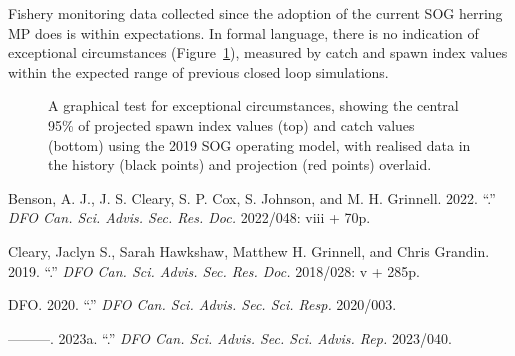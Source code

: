 \documentclass[11pt]{book}
\begin{document}
Fishery monitoring data collected since the adoption of the current SOG herring MP does is within expectations. In formal language, there is no indication of exceptional circumstances (Figure~\ref{fig:ECfig}), measured by catch and spawn index values within the expected range of previous closed loop simulations.
\begin{figure}
 \caption{A graphical test for exceptional circumstances, showing the central 95\% of projected spawn index values (top) and catch values (bottom) using the 2019 SOG operating model, with realised data in the history (black points) and projection (red points) overlaid.}\label{fig:ECfig}
\end{figure}
\hypertarget{refs}{}
\begin{CSLReferences}{1}{0}
%
Benson, A. J., J. S. Cleary, S. P. Cox, S. Johnson, and M. H. Grinnell. 2022. {``.''} \emph{DFO Can. Sci. Advis. Sec. Res. Doc.} 2022/048: viii + 70p.

%
Cleary, Jaclyn S., Sarah Hawkshaw, Matthew H. Grinnell, and Chris Grandin. 2019. {``.''} \emph{DFO Can. Sci. Advis. Sec. Res. Doc.} 2018/028: v + 285p.

%
DFO. 2020. {``.''} \emph{DFO Can. Sci. Advis. Sec. Sci. Resp.} 2020/003.

%
---------. 2023a. {``.''} \emph{DFO Can. Sci. Advis. Sec. Sci. Advis. Rep.} 2023/040.


\end{CSLReferences}
\end{document}
